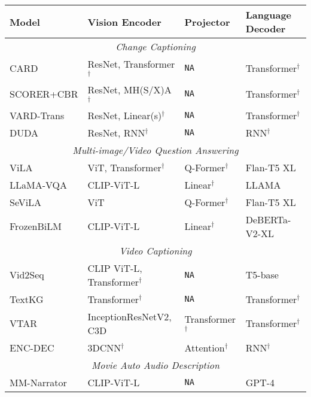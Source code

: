 \begin{table}[htbp]
    \vspace{-17.5em}
    \centering
    \begin{tabularx}{\textwidth}{llll}
        \toprule
          \textbf{Model} & \textbf{Vision Encoder} & \textbf{Projector} & \textbf{Language Decoder} \\
        \midrule
          \multicolumn{4}{c}{\textit{Change Captioning}} \\
        \midrule
          CARD \cite{cc_card} & ResNet, Transformer$^\dag$ & \texttt{NA} & Transformer$^\dag$ \\
          SCORER+CBR \cite{cc_scorer} & ResNet, MH(S/X)A$^\dag$ & \texttt{NA} & Transformer$^\dag$ \\
          VARD-Trans \cite{cc_vard} & ResNet, Linear(s)$^\dag$ & \texttt{NA} & Transformer$^\dag$ \\
          DUDA \cite{cc_duda} & ResNet, RNN$^\dag$ & \texttt{NA} & RNN$^\dag$\\
        \midrule
          \multicolumn{4}{c}{\textit{Multi-image/Video Question Answering}} \\
        \midrule
          ViLA \cite{videoqa_vila} & ViT, Transformer$^\dag$ & Q-Former$^\dag$ & {Flan-T5 XL} \\
          LLaMA-VQA \cite{videoqa_llamavqa} & CLIP-ViT-L & Linear$^\dag$ & {LLAMA} \\
          SeViLA \cite{videoqa_sevila} & ViT & Q-Former$^\dag$ & {Flan-T5 XL} \\
          FrozenBiLM \cite{videoqa_fbilm} & CLIP-ViT-L & Linear$^\dag$ & {DeBERTa-V2-XL} \\
        \midrule
          \multicolumn{4}{c}{\textit{Video Captioning}} \\
        \midrule
          Vid2Seq \cite{vc_vid2seq} &  {CLIP ViT-L, Transformer$^\dag$} & \texttt{NA} & {T5-base} \\
          TextKG \cite{vc_textkg} & Transformer$^\dag$ & \texttt{NA} & Transformer$^\dag$ \\
          VTAR \cite{vc_vtar} & {InceptionResNetV2, C3D} & Transformer$^\dag$ & Transformer$^\dag$ \\
          ENC-DEC \cite{vc_task} & 3DCNN$^\dag$ & Attention$^\dag$ & RNN$^\dag$ \\
        \midrule
          \multicolumn{4}{c}{\textit{Movie Auto Audio Description}} \\
        \midrule
          MM-Narrator \cite{maad_mm_narrator} & CLIP-ViT-L & \texttt{NA} & {GPT-4} \\

\end{tabularx}
\end{table}
